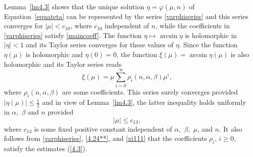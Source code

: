 \documentclass[10pt, a4paper]{article}
\theoremstyle{plain}
\theoremstyle{definition}
\numberwithin{equation}{section}
\def\a{\alpha}
\def\b{\beta}
\begin{document}
Lemma~\ref{lm4.3} shows that the unique solution $\eta=\varphi(\mu, n)$ of Equation~\eqref{equateta} can be represented by the series
\eqref{varphiseries} and this series converges for $|\mu|<c_{10}$, where $c_{10}$ independent of $n$, while the coefficients in \eqref{varphiseries} satisfy \eqref{maincoeff}.
The function $\eta\mapsto \arcsin\eta$ is holomorphic in $|\eta|<1$ and its Taylor series converges for these values of $\eta.$ Since the function $\eta(\mu)$ is   holomorphic and $\eta(0)=0$, the function $\xi(\mu)=\arcsin\eta(\mu)$ is also holomorphic and its Taylor series reads
\begin{equation}\label{xi111}
\xi(\mu)=\mu\sum\limits_{i=0}^\infty \rho_i(n,\alpha, \beta)\mu^i,
\end{equation}
where $\rho_i(n,\alpha, \beta)$ are some coefficients. This series surely converges provided $|\eta(\mu)|\leqslant \frac{1}{2}$ and in view of Lemma~\ref{lm4.3}, the latter inequality holds uniformly in $\a,$ $\b$ and $n$ provided
\begin{equation}\label{4.2}
|\mu|\leqslant c_{13},
\end{equation}
where $c_{13}$ is some fixed positive constant independent of $\a,$ $\b,$ $\mu$, and $n.$ It also follows from \eqref{varphiseries}, \eqref{4.24**}, and \eqref{xi111} that the coefficients $\rho_i$,
$i\geqslant 0$,   satisfy the estimates (\ref{4.3}).
\end{document}
